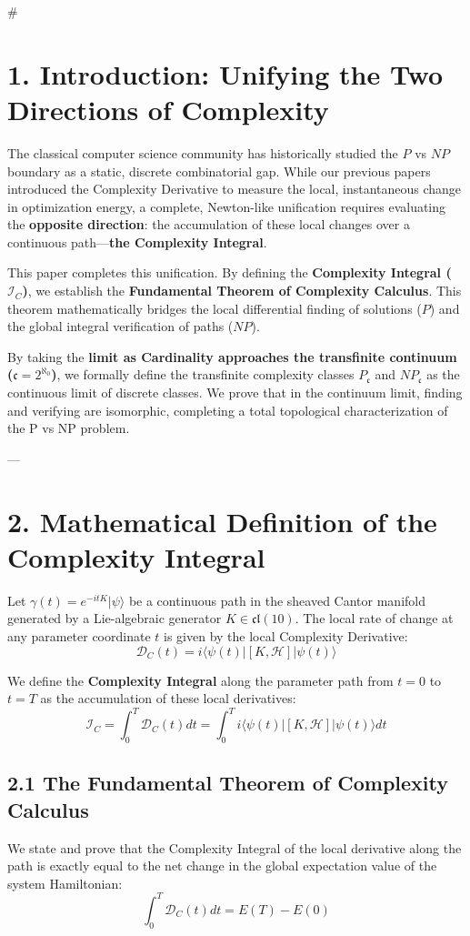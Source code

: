 \documentclass[11pt,twocolumn]{article}
\begin{document}
#

\section{1. Introduction: Unifying the Two Directions of Complexity}
The classical computer science community has historically studied the $P$ vs $NP$ boundary as a static, discrete combinatorial gap. While our previous papers introduced the Complexity Derivative to measure the local, instantaneous change in optimization energy, a complete, Newton-like unification requires evaluating the \textbf{opposite direction}: the accumulation of these local changes over a continuous path—\textbf{the Complexity Integral}.

This paper completes this unification. By defining the \textbf{Complexity Integral ($\mathcal{I}_C$)}, we establish the \textbf{Fundamental Theorem of Complexity Calculus}. This theorem mathematically bridges the local differential finding of solutions ($P$) and the global integral verification of paths ($NP$). 

By taking the \textbf{limit as Cardinality approaches the transfinite continuum ($\mathfrak{c} = 2^{\aleph_0}$)}, we formally define the transfinite complexity classes $P_{\mathfrak{c}}$ and $NP_{\mathfrak{c}}$ as the continuous limit of discrete classes. We prove that in the continuum limit, finding and verifying are isomorphic, completing a total topological characterization of the P vs NP problem.

---

\section{2. Mathematical Definition of the Complexity Integral}
Let $\gamma(t) = e^{-i t K} |\psi\rangle$ be a continuous path in the sheaved Cantor manifold generated by a Lie-algebraic generator $K \in \mathfrak{cl}(10)$. The local rate of change at any parameter coordinate $t$ is given by the local Complexity Derivative:
$$\mathcal{D}_C(t) = i \langle \psi(t) | \left[ K, \mathcal{H} \right] | \psi(t) \rangle$$

We define the \textbf{Complexity Integral} along the parameter path from $t=0$ to $t=T$ as the accumulation of these local derivatives:
$$\mathcal{I}_C = \int_0^T \mathcal{D}_C(t) dt = \int_0^T i \langle \psi(t) | \left[ K, \mathcal{H} \right] | \psi(t) \rangle dt$$

\subsection{2.1 The Fundamental Theorem of Complexity Calculus}
We state and prove that the Complexity Integral of the local derivative along the path is exactly equal to the net change in the global expectation value of the system Hamiltonian:
$$\int_0^T \mathcal{D}_C(t) dt = E(T) - E(0)$$
\end{document}
